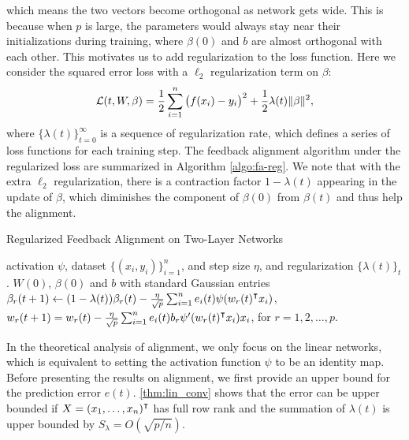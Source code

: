 which means the two vectors become orthogonal as network gets wide. This is because when $p$ is large, the parameters would always stay near their initializations during training, where $\beta(0)$ and $b$ are almost orthogonal with each other. This motivates us to add regularization to the loss function. Here we consider the squared error loss with a $\ell_2$ regularization term on $\beta$:
\begin{equation}
\label{eqn:loss-with-reg}
\mathcal{L}(t, W, \beta) = \frac{1}{2}\sum_{i=1}^n\big(f(x_i)-y_i\big)^2 + \frac{1}{2}\lambda(t)\|\beta\|^2,
\end{equation}
where $\{\lambda(t)\}_{t=0}^\infty$ is a sequence of regularization rate, which defines a series of loss functions for each training step. The feedback alignment algorithm under the regularized loss are summarized in Algorithm \ref{algo:fa-reg}. We note that with the extra $\ell_2$ regularization, there is a contraction factor $1-\lambda(t)$ appearing in the update of $\beta$, which diminishes the component of $\beta(0)$ from $\beta(t)$ and thus help the alignment.

\begin{algorithm}[H]
\centering
\caption{Regularized Feedback Alignment on Two-Layer Networks}\label{algo:fa-reg}
    \begin{algorithmic}[1]
        \Require activation $\psi$, dataset $\{(x_i,y_i)\}_{i=1}^n$, and step size $\eta$, and regularization $\{\lambda(t)\}_t$.
         $W(0)$, $\beta(0)$ and $b$ with standard Gaussian entries
            \State $\beta_r(t+1) \gets (1-\lambda(t))\beta_r(t) - \frac{\eta}{\sqrt p} \sum_{i=1}^n e_i(t)\psi(w_r(t)\transpose x_i)$,
            \State $w_r(t+1) = w_r(t) - \frac{\eta}{\sqrt{p}} \sum_{i=1}^n e_i(t) b_r\psi'(w_r(t)\transpose x_i)x_i$, for $r=1,2,\ldots,p$.
        \EndWhile
    \end{algorithmic}    
\end{algorithm}

In the theoretical analysis of alignment, we only focus on the linear networks, which is equivalent to setting the activation function $\psi$ to be an identity map. Before presenting the results on alignment, we first provide an upper bound for the prediction error $e(t)$. \cref{thm:lin_conv} shows that the error can be upper bounded if $X = (x_1,\ldots,x_n)\transpose$ has full row rank and the summation of $\lambda(t)$ is upper bounded by $S_\lambda = O(\sqrt{p/n})$.

